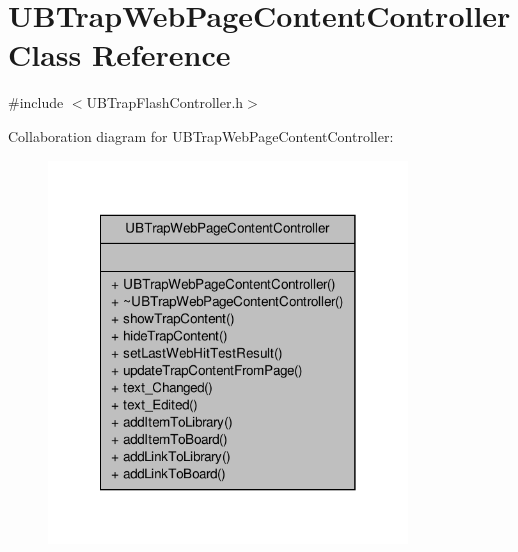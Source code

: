 \hypertarget{class_u_b_trap_web_page_content_controller}{\section{U\-B\-Trap\-Web\-Page\-Content\-Controller Class Reference}
\label{d9/d3a/class_u_b_trap_web_page_content_controller}
}


{\ttfamily \#include $<$U\-B\-Trap\-Flash\-Controller.\-h$>$}



Collaboration diagram for U\-B\-Trap\-Web\-Page\-Content\-Controller\-:
\nopagebreak
\begin{figure}[H]
\begin{center}
\leavevmode
\includegraphics[width=270pt]{d2/d93/class_u_b_trap_web_page_content_controller__coll__graph}
\end{center}
\end{figure}
